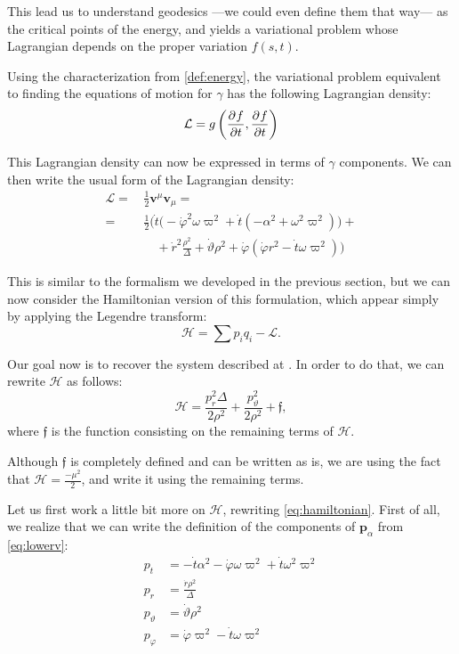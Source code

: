 This lead us to understand geodesics ---we could even define them that way--- as the critical points of the energy, and yields a variational problem whose Lagrangian depends on the proper variation $f(s,t)$.

Using the characterization from \autoref{def:energy}, the variational problem equivalent to finding the equations of motion for $\gamma$ has the following Lagrangian density:
\begin{equation}
	\label{eq:1stlagrangian}
	\mathcal{L} = g\left( \frac{\partial^{} f}{\partial t}, \frac{\partial^{} f}{\partial t} \right)
\end{equation}

This Lagrangian density can now be expressed in terms of $\gamma$ components. We can then write the usual form of the Lagrangian density:
\begin{align}
\mathcal{L} =\,& \frac{1}{2} \mathbf{v}^\mu \mathbf{v}_\mu = \\
=\,& \frac{1}{2} \Biggl( \dot{t}\biggl( -\dot{\varphi}^2\omega\varpi^2 + \dot{t} \left( -\alpha^2 + \omega^2\varpi^2 \right) \biggr) +\\
&\quad + \dot{r}^2\frac{\rho^2}{\Delta} + \dot{\vartheta}\rho^2 + \dot{\varphi}\left( \dot{\varphi} r^2 - \dot{t} \omega \varpi^2 \right) \Biggr)
\end{align}

This is similar to the formalism we developed in the previous section, but we can now consider the Hamiltonian version of this formulation, which appear simply by applying the Legendre transform:
\begin{equation*}
	\mathcal{H} = \sum p_i q_i - \mathcal{L}.
\end{equation*}

Our goal now is to recover the system described at \cite[Eq. (A.15)]{thorne15}. In order to do that, we can rewrite $\mathcal{H}$ as follows:
\begin{equation}
	\label{eq:hamiltonian}
	\mathcal{H} = \frac{p_r^2 \Delta}{2\rho^2} + \frac{p_\vartheta^2}{2\rho^2} + \mathfrak{f},
\end{equation}
where $\mathfrak{f}$ is the function consisting on the remaining terms of $\mathcal{H}$.

Although $\mathfrak{f}$ is completely defined and can be written as is, we are using the fact that $\mathcal{H} = \frac{-\mu^2}{2}$, and write it using the remaining terms.

Let us first work a little bit more on $\mathcal{H}$, rewriting \autoref{eq:hamiltonian}. First of all, we realize that we can write the definition of the components of $\mathbf{p}_\alpha$ from \autoref{eq:lowerv}:
\begin{align}
	\label{eq:pteq}
	p_t &= -\dot{t}\alpha^2 - \dot{\varphi}\omega\varpi^2 + \dot{t}\omega^2\varpi^2 \\
	\label{eq:preq}
	p_r &= \frac{\dot{r}\rho^2}{\Delta}\\
	\label{eq:pthetaeq}
	p_\vartheta &= \dot{\vartheta}\rho^2\\
	\label{eq:pphieq}
	p_\varphi &= \dot{\varphi}\varpi^2 - \dot{t}\omega\varpi^2\\
\end{align}

